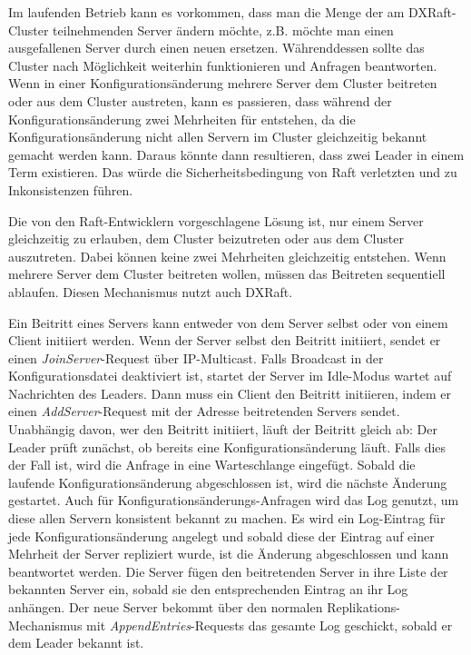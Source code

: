 Im laufenden Betrieb kann es vorkommen, dass man die Menge der am DXRaft-Cluster teilnehmenden Server ändern möchte, z.B. möchte man einen ausgefallenen Server durch einen neuen ersetzen. Währenddessen sollte das Cluster nach Möglichkeit weiterhin funktionieren und Anfragen beantworten. Wenn in einer Konfigurationsänderung mehrere Server dem Cluster beitreten oder aus dem Cluster austreten, kann es passieren, dass während der Konfigurationsänderung zwei Mehrheiten für entstehen, da die Konfigurationsänderung nicht allen Servern im Cluster gleichzeitig bekannt gemacht werden kann. Daraus könnte dann resultieren, dass zwei Leader in einem Term existieren. Das würde die Sicherheitsbedingung von Raft verletzten und zu Inkonsistenzen führen.

Die von den Raft-Entwicklern vorgeschlagene Lösung ist, nur einem Server gleichzeitig zu erlauben, dem Cluster beizutreten oder aus dem Cluster auszutreten. Dabei können keine zwei Mehrheiten gleichzeitig entstehen. Wenn mehrere Server dem Cluster beitreten wollen, müssen das Beitreten sequentiell ablaufen. Diesen Mechanismus nutzt auch DXRaft.

Ein Beitritt eines Servers kann entweder von dem Server selbst oder von einem Client initiiert werden. Wenn der Server selbst den Beitritt initiiert, sendet er einen \textit{JoinServer}-Request über IP-Multicast. Falls Broadcast in der Konfigurationsdatei deaktiviert ist, startet der Server im Idle-Modus wartet auf Nachrichten des Leaders. Dann muss ein Client den Beitritt initiieren, indem er einen \textit{AddServer}-Request mit der Adresse beitretenden Servers sendet. Unabhängig davon, wer den Beitritt initiiert, läuft der Beitritt gleich ab: Der Leader prüft zunächst, ob bereits eine Konfigurationsänderung läuft. Falls dies der Fall ist, wird die Anfrage in eine Warteschlange eingefügt. Sobald die laufende Konfigurationsänderung abgeschlossen ist, wird die nächste Änderung gestartet. Auch für Konfigurationsänderungs-Anfragen wird das Log genutzt, um diese allen Servern konsistent bekannt zu machen. Es wird ein Log-Eintrag für jede Konfigurationsänderung angelegt und sobald diese der Eintrag auf einer Mehrheit der Server repliziert wurde, ist die Änderung abgeschlossen und kann beantwortet werden. Die Server fügen den beitretenden Server in ihre Liste der bekannten Server ein, sobald sie den entsprechenden Eintrag an ihr Log anhängen. Der neue Server bekommt über den normalen Replikations-Mechanismus mit \textit{AppendEntries}-Requests das gesamte Log geschickt, sobald er dem Leader bekannt ist.

